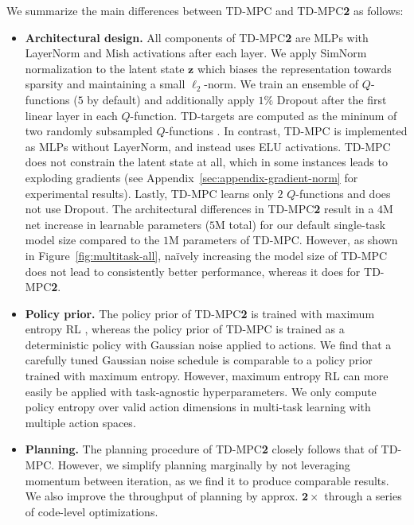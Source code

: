 \documentclass{article}
\begin{document}
We summarize the main differences between TD-MPC and TD-MPC\textbf{2} as follows:
\begin{itemize}
    \item \textbf{Architectural design.} All components of TD-MPC\textbf{2} are MLPs with LayerNorm \citep{Ba2016LayerN} and Mish \citep{Misra2019MishAS} activations after each layer. We apply SimNorm normalization to the latent state $\mathbf{z}$ which biases the representation towards sparsity and maintaining a small $\ell_{2}$-norm. We train an ensemble of $Q$-functions ($5$ by default) and additionally apply $1\%$ Dropout \citep{srivastava2014dropout} after the first linear layer in each $Q$-function. TD-targets are computed as the mininum of two randomly subsampled $Q$-functions \citep{chen2021randomized}. In contrast, TD-MPC is implemented as MLPs without LayerNorm, and instead uses ELU \citep{clevert2015fast} activations. TD-MPC does not constrain the latent state at all, which in some instances leads to exploding gradients (see Appendix~\ref{sec:appendix-gradient-norm} for experimental results). Lastly, TD-MPC learns only $2$ $Q$-functions and does not use Dropout. The architectural differences in TD-MPC\textbf{2} result in a $4$M net increase in learnable parameters ($5$M total) for our default single-task model size compared to the $1$M parameters of TD-MPC. However, as shown in Figure~\ref{fig:multitask-all}, naïvely increasing the model size of TD-MPC does not lead to consistently better performance, whereas it does for TD-MPC\textbf{2}.
    \item \textbf{Policy prior.} The policy prior of TD-MPC\textbf{2} is trained with maximum entropy RL \citep{ziebart2008maximum, Haarnoja2018SoftAA}, whereas the policy prior of TD-MPC is trained as a deterministic policy with Gaussian noise applied to actions. We find that a carefully tuned Gaussian noise schedule is comparable to a policy prior trained with maximum entropy. However, maximum entropy RL can more easily be applied with task-agnostic hyperparameters. We only compute policy entropy over valid action dimensions in multi-task learning with multiple action spaces.
    \item \textbf{Planning.} The planning procedure of TD-MPC\textbf{2} closely follows that of TD-MPC. However, we simplify planning marginally by not leveraging momentum between iteration, as we find it to produce comparable results. We also improve the throughput of planning by approx. $\mathbf{2\times}$ through a series of code-level optimizations.

\end{itemize}
\end{document}
